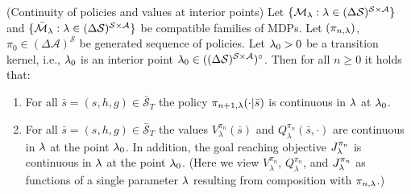 \begin{lemma}(Continuity of \eUDRL{} policies and values at interior points)
\label{le:intcont}
Let $\{\mathcal{M}_{\mathit{\lambda}} : \mathit{\lambda}\in (\Delta\mathcal{S})^{\mathcal{S}\times\mathcal{A}} \}$ and $\{\bar{\mathcal{M}}_{\mathit{\lambda}} : \mathit{\lambda}\in (\Delta\mathcal{S})^{\mathcal{S}\times\mathcal{A}}\}$ be compatible families of MDPs.
Let $(\pi_{n,\mathit{\lambda}})$, $\pi_0 \in (\Delta \mathcal{A})^{\mathcal{S}}$
be \eUDRL{} generated sequence of policies.
Let $\mathit{\lambda}_0>0$ be a transition kernel, i.e., $\mathit{\lambda}_0$ is  an interior point $\mathit{\lambda}_0 \in ((\Delta \mathcal{S})^{\mathcal{S}\times\mathcal{A}})^{\circ}$.
Then for all $n\geq 0$ it holds that:
\begin{enumerate}
\item
For all $\bar{s} = (s,h,g) \in \bar{\mathcal{S}}_T$ the policy
$\pi_{n+1,\mathit{\lambda}}(\cdot|\bar{s})$ is continuous in  $\mathit{\lambda}$ at $\mathit{\lambda}_0$.
\item
For all $\bar{s} = (s,h,g) \in \bar{\mathcal{S}}_T$
the values $V_{\lambda}^{\pi_n}(\bar{s})$ and $Q_{\lambda}^{\pi_n}(\bar{s},\cdot)$
are continuous in $\mathit{\lambda}$ at the point $\mathit{\lambda}_0$.
In addition, the goal reaching objective $J_{\mathit{\lambda}}^{\pi_n}$ is continuous in $\mathit{\lambda}$ at the point $\mathit{\lambda}_0$. (Here we view $V_{\lambda}^{\pi_n}$, $Q_{\lambda}^{\pi_n}$, and $J_{\mathit{\lambda}}^{\pi_n}$ as functions of a single parameter $\mathit{\lambda}$ resulting from composition with $\pi_{n,\mathit{\lambda}}$.)
\end{enumerate}
\end{lemma}
